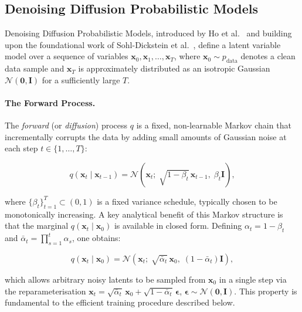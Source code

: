 
\subsection{Denoising Diffusion Probabilistic Models}
\label{subsec:ddpm}

Denoising Diffusion Probabilistic Models, introduced by Ho et al.\
\cite{ho2020denoising} and building upon the foundational work of Sohl-Dickstein
et al.\ \cite{sohl2015deep}, define a latent variable model over a sequence of
variables $\mathbf{x}_0, \mathbf{x}_1, \ldots, \mathbf{x}_T$, where
$\mathbf{x}_0 \sim p_{\text{data}}$ denotes a clean data sample and
$\mathbf{x}_T$ is approximately distributed as an isotropic Gaussian
$\mathcal{N}(\mathbf{0}, \mathbf{I})$ for a sufficiently large $T$.

\paragraph{The Forward Process.}
The \emph{forward} (or \emph{diffusion}) process $q$ is a fixed, non-learnable
Markov chain that incrementally corrupts the data by adding small amounts of
Gaussian noise at each step $t \in \{1, \ldots, T\}$:

\begin{equation}
    q(\mathbf{x}_t \mid \mathbf{x}_{t-1}) =
    \mathcal{N}\!\left(\mathbf{x}_t;\;
    \sqrt{1 - \beta_t}\,\mathbf{x}_{t-1},\; \beta_t \mathbf{I}\right),
    \label{eq:ddpm_forward_step}
\end{equation}

\noindent where $\{\beta_t\}_{t=1}^T \subset (0, 1)$ is a fixed variance
schedule, typically chosen to be monotonically increasing. A key analytical
benefit of this Markov structure is that the marginal $q(\mathbf{x}_t
\mid \mathbf{x}_0)$ is available in closed form. Defining
$\alpha_t = 1 - \beta_t$ and $\bar{\alpha}_t = \prod_{s=1}^{t} \alpha_s$,
one obtains:

\begin{equation}
    q(\mathbf{x}_t \mid \mathbf{x}_0) =
    \mathcal{N}\!\left(\mathbf{x}_t;\;
    \sqrt{\bar{\alpha}_t}\,\mathbf{x}_0,\;
    (1 - \bar{\alpha}_t)\mathbf{I}\right),
    \label{eq:ddpm_marginal}
\end{equation}

which allows arbitrary noisy latents to be sampled from $\mathbf{x}_0$
in a single step via the reparameterisation
$\mathbf{x}_t = \sqrt{\bar{\alpha}_t}\,\mathbf{x}_0 +
\sqrt{1 - \bar{\alpha}_t}\,\boldsymbol{\epsilon}$,
$\boldsymbol{\epsilon} \sim \mathcal{N}(\mathbf{0}, \mathbf{I})$.
This property is fundamental to the efficient training procedure described
below.

